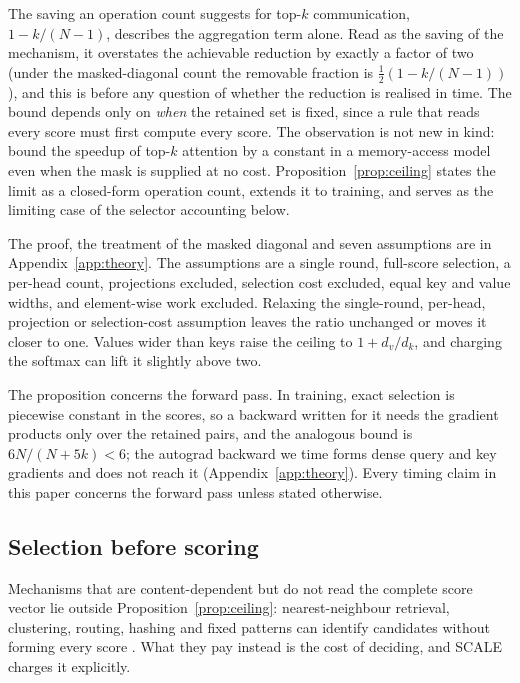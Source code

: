 The saving an operation count suggests for top-$k$ communication,
$1 - k/(N-1)$, describes the aggregation term alone. Read as the saving of the
mechanism, it overstates the achievable reduction by exactly a factor of two
(under the masked-diagonal count the removable fraction is
$\tfrac12(1 - k/(N-1))$), and this is before any question of whether the
reduction is realised in time. The bound depends only on \emph{when} the
retained set is fixed, since a rule that reads every score must first compute
every score. The observation is not new in kind: \citet{chen2023dfss} bound the
speedup of top-$k$ attention by a constant in a memory-access model even when
the mask is supplied at no cost. Proposition~\ref{prop:ceiling} states the
limit as a closed-form operation count, extends it to training, and serves as
the limiting case of the selector accounting below.

The proof, the treatment of the masked diagonal and seven assumptions are in
Appendix~\ref{app:theory}. The assumptions are a single round, full-score
selection, a per-head count, projections excluded, selection cost excluded,
equal key and value widths, and element-wise work excluded. Relaxing the
single-round, per-head, projection or selection-cost assumption leaves the ratio
unchanged or moves it closer to one. Values wider than keys raise the ceiling to
$1 + d_v/d_k$, and charging the softmax can lift it slightly above two.

The proposition concerns the forward pass. In training, exact selection is piecewise constant in the scores,
so a backward written for it needs the gradient products only over the retained
pairs, and the analogous bound is $6N/(N+5k) < 6$; the autograd backward we
time forms dense query and key gradients and does not reach it
(Appendix~\ref{app:theory}). Every timing claim in this paper concerns the
forward pass unless stated otherwise.

\subsection{Selection before scoring}
\label{sec:escape}

Mechanisms that are content-dependent but do not read the complete score vector
lie outside Proposition~\ref{prop:ceiling}: nearest-neighbour retrieval,
clustering, routing, hashing and fixed patterns can identify candidates without
forming every score \citep{kitaev2020reformer,roy2021routing,yuan2025nsa}. What
they pay instead is the cost of deciding, and SCALE charges it explicitly.

